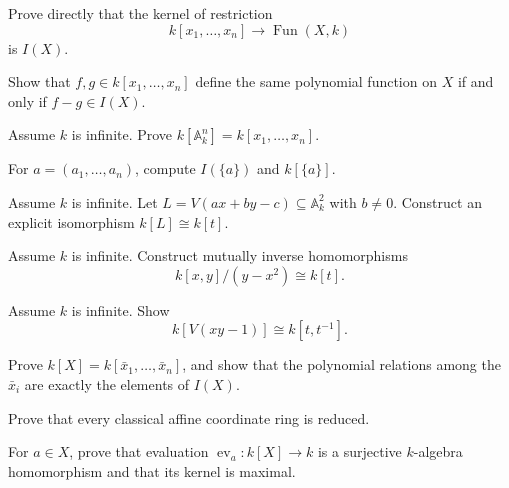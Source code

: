 
\begin{exercise}\label{ex:vi03-kernel}
Prove directly that the kernel of restriction
\[
k[x_1,\dots,x_n]\to\operatorname{Fun}(X,k)
\]
is \(I(X)\).
\end{exercise}

\begin{exercise}\label{ex:vi03-same-function}
Show that \(f,g\in k[x_1,\dots,x_n]\) define the same polynomial function on \(X\) if and
only if \(f-g\in I(X)\).
\end{exercise}

\begin{exercise}\label{ex:vi03-affine-space}
Assume \(k\) is infinite.  Prove \(k[\mathbb A_k^n]=k[x_1,\dots,x_n]\).
\end{exercise}

\begin{exercise}\label{ex:vi03-point}
For \(a=(a_1,\dots,a_n)\), compute \(I(\{a\})\) and \(k[\{a\}]\).
\end{exercise}

\begin{exercise}\label{ex:vi03-line}
Assume \(k\) is infinite.  Let \(L=V(ax+by-c)\subseteq\mathbb A_k^2\) with \(b\neq0\).  Construct an explicit
isomorphism \(k[L]\cong k[t]\).
\end{exercise}

\begin{exercise}\label{ex:vi03-parabola}
Assume \(k\) is infinite.  Construct mutually inverse homomorphisms
\[
k[x,y]/(y-x^2)\cong k[t].
\]
\end{exercise}

\begin{exercise}\label{ex:vi03-hyperbola}
Assume \(k\) is infinite.  Show
\[
k[V(xy-1)]\cong k[t,t^{-1}].
\]
\end{exercise}

\begin{exercise}\label{ex:vi03-generators-relations}
Prove \(k[X]=k[\bar x_1,\dots,\bar x_n]\), and show that the polynomial relations among the
\(\bar x_i\) are exactly the elements of \(I(X)\).
\end{exercise}

\begin{exercise}\label{ex:vi03-reduced}
Prove that every classical affine coordinate ring is reduced.
\end{exercise}

\begin{exercise}\label{ex:vi03-evaluation}
For \(a\in X\), prove that evaluation \(\operatorname{ev}_a:k[X]\to k\) is a surjective
\(k\)-algebra homomorphism and that its kernel is maximal.
\end{exercise}

